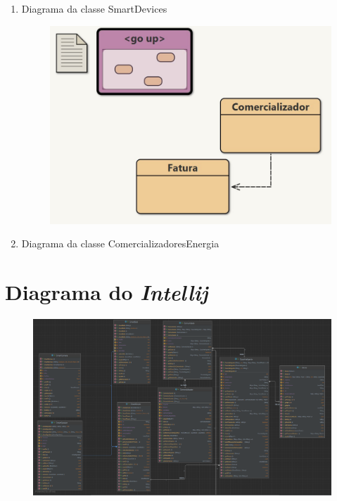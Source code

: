 \documentclass[11pt,a4paper]{report}
\begin{document}
\begin{enumerate}
\item Diagrama da classe SmartDevices 
\vspace{15mm} %

    \begin{figure}[H]
    		\includegraphics[scale=0.8]{diagrama4.jpg}
	\end{figure}
	
\item Diagrama da classe ComercializadoresEnergia

\end{enumerate}
    \pagebreak

\chapter{Diagrama do \textit{Intellij}}
    \begin{figure}[H]
        \includegraphics[scale=0.3]{diagrama itellij1.png}
	\end{figure}
	
\end{document}
